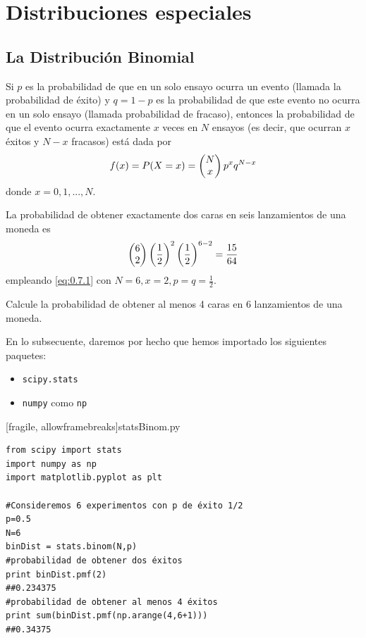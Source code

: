 \chapter{Distribuciones especiales}


\section{La Distribución Binomial}


 Si $p$ es la probabilidad de que en un solo ensayo ocurra un evento (llamada la probabilidad de éxito) y $q = 1 - p$ es la
probabilidad de que este evento no ocurra en un solo ensayo (llamada probabilidad de fracaso), entonces la probabilidad de que el evento ocurra exactamente $x$ veces en $N$ ensayos (es decir, que ocurran $x$ éxitos y $N - x$ fracasos) está
dada por
\begin{align}
 \label{eq:0.7.1}
 f(x)=P(X=x)=\begin{pmatrix} N \\ x\end{pmatrix}p^{x}q^{N-x}
\end{align}
donde $x=0,1,...,N.$


 \begin{ejemplo}
  \label{exmp:0.7.1}
  La probabilidad de obtener exactamente dos caras en seis lanzamientos de una moneda es
  \begin{align}
   \begin{pmatrix} 6 \\ 2\end{pmatrix}\left( \dfrac{1}{2} \right)^{2}\left( \dfrac{1}{2} \right)^{6-2}=\dfrac{15}{64}
  \end{align}
empleando \eqref{eq:0.7.1} con $N=6, x=2, p=q=\frac{1}{2}.$
 \end{ejemplo}



\begin{ejemplo}
 \label{exmp:0.7.2}
 Calcule la probabilidad de obtener al menos 4 caras en 6 lanzamientos de una moneda.
\end{ejemplo}



 En lo subsecuente, daremos por hecho que hemos importado los siguientes paquetes:
 \begin{itemize}
  \item \texttt{scipy.stats}
  \item \texttt{numpy} como \texttt{np}
 \end{itemize}


[fragile, allowframebreaks]{statsBinom.py}
\begin{verbatim}
from scipy import stats
import numpy as np
import matplotlib.pyplot as plt

#Consideremos 6 experimentos con p de éxito 1/2
p=0.5
N=6
binDist = stats.binom(N,p)
#probabilidad de obtener dos éxitos
print binDist.pmf(2)
##0.234375
#probabilidad de obtener al menos 4 éxitos
print sum(binDist.pmf(np.arange(4,6+1)))
##0.34375
 \end{verbatim}


